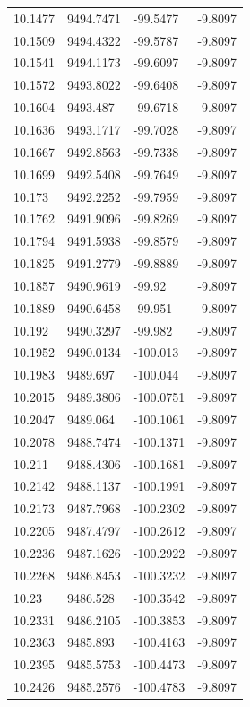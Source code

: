 \begin{table}[H]
\begin{tabular}{llll}
10.1477 & 9494.7471 & -99.5477 & -9.8097 \\
10.1509 & 9494.4322 & -99.5787 & -9.8097 \\
10.1541 & 9494.1173 & -99.6097 & -9.8097 \\
10.1572 & 9493.8022 & -99.6408 & -9.8097 \\
10.1604 & 9493.487 & -99.6718 & -9.8097 \\
10.1636 & 9493.1717 & -99.7028 & -9.8097 \\
10.1667 & 9492.8563 & -99.7338 & -9.8097 \\
10.1699 & 9492.5408 & -99.7649 & -9.8097 \\
10.173 & 9492.2252 & -99.7959 & -9.8097 \\
10.1762 & 9491.9096 & -99.8269 & -9.8097 \\
10.1794 & 9491.5938 & -99.8579 & -9.8097 \\
10.1825 & 9491.2779 & -99.8889 & -9.8097 \\
10.1857 & 9490.9619 & -99.92 & -9.8097 \\
10.1889 & 9490.6458 & -99.951 & -9.8097 \\
10.192 & 9490.3297 & -99.982 & -9.8097 \\
10.1952 & 9490.0134 & -100.013 & -9.8097 \\
10.1983 & 9489.697 & -100.044 & -9.8097 \\
10.2015 & 9489.3806 & -100.0751 & -9.8097 \\
10.2047 & 9489.064 & -100.1061 & -9.8097 \\
10.2078 & 9488.7474 & -100.1371 & -9.8097 \\
10.211 & 9488.4306 & -100.1681 & -9.8097 \\
10.2142 & 9488.1137 & -100.1991 & -9.8097 \\
10.2173 & 9487.7968 & -100.2302 & -9.8097 \\
10.2205 & 9487.4797 & -100.2612 & -9.8097 \\
10.2236 & 9487.1626 & -100.2922 & -9.8097 \\
10.2268 & 9486.8453 & -100.3232 & -9.8097 \\
10.23 & 9486.528 & -100.3542 & -9.8097 \\
10.2331 & 9486.2105 & -100.3853 & -9.8097 \\
10.2363 & 9485.893 & -100.4163 & -9.8097 \\
10.2395 & 9485.5753 & -100.4473 & -9.8097 \\
10.2426 & 9485.2576 & -100.4783 & -9.8097 \\

\end{tabular}
\end{table}
